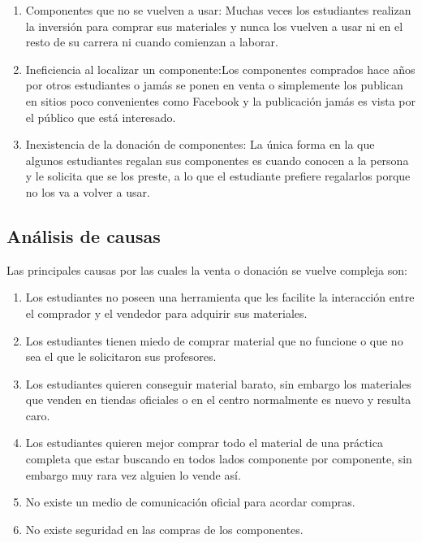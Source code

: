 \begin{enumerate}
	\item Componentes que no se vuelven a usar: Muchas veces los estudiantes realizan la inversión para comprar sus materiales y nunca los vuelven a usar ni en el resto de su carrera ni cuando comienzan a laborar.

	\item Ineficiencia al localizar un componente:Los componentes comprados hace años por otros estudiantes o jamás se ponen en venta o simplemente los publican en sitios poco convenientes como Facebook y la publicación jamás es vista por el público que está interesado.

	\item Inexistencia de la donación de componentes: La única forma en la que algunos estudiantes regalan sus componentes es cuando conocen a la persona y le solicita que se los preste, a lo que el estudiante prefiere regalarlos porque no los va a volver a usar.
\end{enumerate}

\subsection{Análisis de causas}

Las principales causas por las cuales la venta o donación se vuelve compleja son:

\begin{enumerate}
	\item Los estudiantes no poseen una herramienta que les facilite la interacción entre el comprador y el vendedor para adquirir sus materiales.
	\item Los estudiantes tienen miedo de comprar material que no funcione o que no sea el que le solicitaron sus profesores.
	\item Los estudiantes quieren conseguir material barato, sin embargo los materiales que venden en tiendas oficiales o en el centro normalmente es nuevo y resulta caro.
	\item Los estudiantes quieren mejor comprar todo el material de una práctica completa que estar buscando en todos lados componente por componente, sin embargo muy rara vez alguien lo vende así.
	\item No existe un medio de comunicación oficial para acordar compras.
	\item No existe seguridad en las compras de los componentes.
\end{enumerate}
